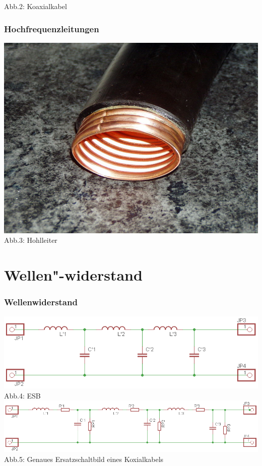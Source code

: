 \begin{frame}
\begin{center}
    {\tiny Abb.2: Koaxialkabel \cite{wm}}
  \end{center}
\end{frame}

\begin{frame}
  \frametitle{Hochfrequenzleitungen}
  \begin{center}
    \includegraphics[width=\textwidth,height=.8\textheight,keepaspectratio]{a10/hohl.jpg}\\
    {\tiny Abb.3: Hohlleiter \cite{wp}}
  \end{center}
\end{frame}

\section*{Wellen"-widerstand}
\begin{frame}
  \frametitle{Wellenwiderstand}
  \includegraphics[width=\textwidth,height=.35\textheight,keepaspectratio]{a10/wellenesb.png}\\
  {\tiny Abb.4: ESB}
  \vspace{2em}\\
  \includegraphics[width=\textwidth,height=.35\textheight,keepaspectratio]{a10/wellenesbex.png}\\
  {\tiny Abb.5: Genaues Ersatzschaltbild eines Koxialkabels}
\end{frame}


